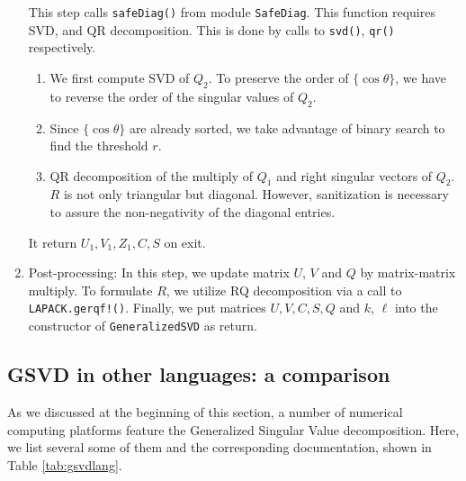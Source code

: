 \begin{enumerate}
    This step calls \texttt{safeDiag()} from module \texttt{SafeDiag}. This function requires SVD, and QR decomposition. This is done by calls to \texttt{svd()}, \texttt{qr()} respectively. 
    \begin{enumerate}
    	\item We first compute SVD of $Q_{2}$. To preserve the order of $\{\cos\theta\}$, we have to reverse the order of the singular values of $Q_{2}$. 
		\item Since $\{\cos\theta\}$ are already sorted, we take advantage of binary search to find the threshold $r$.
		\item QR decomposition of the multiply of $Q_{1}$ and right singular vectors of $Q_{2}$. $R$ is not only triangular but diagonal. However, sanitization is necessary to assure the non-negativity of the diagonal entries. 
    \end{enumerate}
    
    It return $U_1, V_1, Z_1, C, S$ on exit.   
    
    \item Post-processing:
    In this step, we update matrix $U$, $V$ and $Q$ by matrix-matrix multiply. To formulate $R$, we utilize RQ decomposition via a call to \texttt{LAPACK.gerqf!()}. Finally, we put matrices $U, V, C, S, Q$ and $k$, $\ell$ into the constructor of \texttt{GeneralizedSVD} as return. 
\end{enumerate}

\subsection{GSVD in other languages: a comparison}
    As we discussed at the beginning of this section, a number of numerical computing platforms feature the Generalized Singular Value decomposition. Here, we list several some of them and the corresponding documentation, shown in Table \ref{tab:gsvdlang}. 
    
